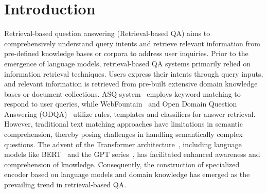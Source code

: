 \documentclass[mathematics,article,submit,moreauthors]{Definitions/mdpi}
\newcommand{\1}[1]{\mathds{1}\left[#1\right]}
\begin{document}

\section{Introduction}
\label{sec:intro}
Retrieval-based question answering (Retrieval-based QA) aims to comprehensively understand query intents and retrieve relevant information from pre-defined knowledge bases or corpora to address user inquiries. 
Prior to the emergence of language models, retrieval-based QA systems primarily relied on information retrieval techniques. Users express their intents through query inputs, and relevant information is retrieved from pre-built extensive domain knowledge bases or document collections. ASQ system~\cite{asq-system} employs keyword matching to respond to user queries, while WebFountain~\cite{watson} and Open Domain Question Answering (ODQA)~\cite{odqa2018} utilize rules, templates and classifiers for answer retrieval. However, traditional text matching approaches have limitations in semantic comprehension, thereby posing challenges in handling semantically complex questions. The advent of the Transformer architecture~\cite{transformers2017}, including language models like BERT~\cite{bert2019} and the GPT series~\cite{gpt,gpt2,gpt3}, has facilitated enhanced awareness and comprehension of knowledge. Consequently, the construction of specialized encoder based on language models and domain knowledge has emerged as the prevailing trend in retrieval-based QA.
\end{document}
